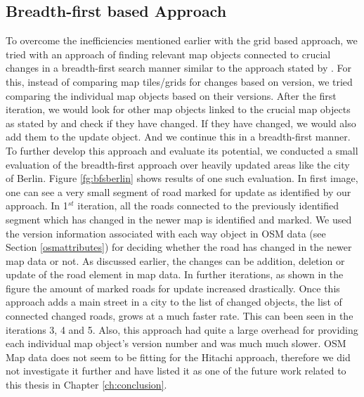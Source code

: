 \subsection{Breadth-first based Approach}
To overcome the inefficiencies mentioned earlier with the grid based approach, we tried with an approach of finding relevant map objects connected to crucial changes in a breadth-first search manner similar to the approach stated by \citet{hitachi}. For this, instead of comparing map tiles/grids for changes based on version, we tried comparing the individual map objects based on their versions. After the first iteration, we would look for other map objects linked to the crucial map objects as stated by \citet{hitachi} and check if they have changed. If they have changed, we would also add them to the update object. And we continue this in a breadth-first manner. To further develop this approach and evaluate its potential, we conducted a small evaluation of the breadth-first approach over heavily updated areas like the city of Berlin. Figure \ref{fg:bfsberlin} shows results of one such evaluation. In first image, one can see a very small segment of road marked for update as identified by our approach. In 1$^{st}$ iteration, all the roads connected to the previously identified segment which has changed in the newer map is identified and marked. We used the version information associated with each way object in OSM data (see Section \ref{osmattributes}) for deciding whether the road has changed in the newer map data or not. As discussed earlier, the changes can be addition, deletion or update of the road element in map data. In further iterations, as shown in the figure the amount of marked roads for update increased drastically. Once this approach adds a main street in a city to the list of changed objects, the list of connected changed roads, grows at a much faster rate. This can been seen in the iterations 3, 4 and 5. Also, this approach had quite a large overhead for providing each individual map object's version number and was much much slower. OSM Map data does not seem to be fitting for the Hitachi approach, therefore we did not investigate it further and have listed it as one of the future work related to this thesis in Chapter \ref{ch:conclusion}.   





